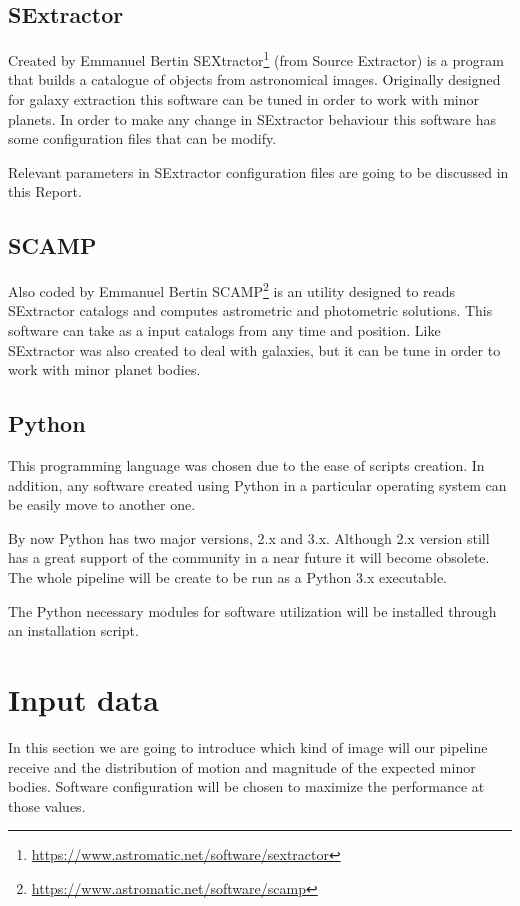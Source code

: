 \documentclass{article}
\begin{document}
\subsection{SExtractor}
Created by Emmanuel Bertin SEXtractor\footnote{\url{https://www.astromatic.net/software/sextractor}} (from Source Extractor) is a program that builds a catalogue of objects from astronomical images. Originally designed for galaxy extraction this software can be tuned in order to work with minor planets. In order to make any change in SExtractor behaviour this software has some configuration files that can be modify.
\par Relevant parameters in SExtractor configuration files are going to be discussed in this Report.

\subsection{SCAMP}
Also coded by Emmanuel Bertin SCAMP\footnote{\url{https://www.astromatic.net/software/scamp}} is an utility designed to reads SExtractor catalogs and computes astrometric and photometric solutions. This software can take as a input catalogs from any time and position. Like SExtractor was also created to deal with galaxies, but it can be tune in order to work with minor planet bodies.

\subsection{Python}
This programming language was chosen due to the ease of scripts creation. In addition, any software created using Python in a particular operating system can be easily move to another one.
\par By now Python has two major versions, 2.x and 3.x. Although 2.x version still has a great support of the community in a near future it will become obsolete. The whole pipeline will be create to be run as a Python 3.x executable.
\par The Python necessary modules for software utilization will be installed through an installation script.

\section{Input data}
In this section we are going to introduce which kind of image will our pipeline receive and the distribution of motion and magnitude of the expected minor bodies. Software configuration will be chosen to maximize the performance at those values.
\end{document}
